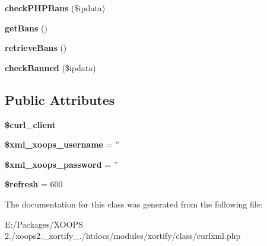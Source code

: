 \begin{DoxyCompactItemize}
\item 
\hypertarget{class_c_u_r_l_x_m_l_xortify_exchange_a1d5d2753c5259c572ea6ded19fced6f5}{{\bfseries check\-P\-H\-P\-Bans} (\$ipdata)}\label{class_c_u_r_l_x_m_l_xortify_exchange_a1d5d2753c5259c572ea6ded19fced6f5}

\item 
\hypertarget{class_c_u_r_l_x_m_l_xortify_exchange_ab4614d34ca9a0546a1885d407137cd22}{{\bfseries get\-Bans} ()}\label{class_c_u_r_l_x_m_l_xortify_exchange_ab4614d34ca9a0546a1885d407137cd22}

\item 
\hypertarget{class_c_u_r_l_x_m_l_xortify_exchange_ac5d062cd907b0b9230a3a7fb7a71cf41}{{\bfseries retrieve\-Bans} ()}\label{class_c_u_r_l_x_m_l_xortify_exchange_ac5d062cd907b0b9230a3a7fb7a71cf41}

\item 
\hypertarget{class_c_u_r_l_x_m_l_xortify_exchange_ae706dddc27baaa3eb21ac2e9417e7760}{{\bfseries check\-Banned} (\$ipdata)}\label{class_c_u_r_l_x_m_l_xortify_exchange_ae706dddc27baaa3eb21ac2e9417e7760}

\end{DoxyCompactItemize}
\subsection*{Public Attributes}
\begin{DoxyCompactItemize}
\item 
\hypertarget{class_c_u_r_l_x_m_l_xortify_exchange_a0f42b7cba3cc6e6acb3da741c2cede43}{{\bfseries \$curl\-\_\-client}}\label{class_c_u_r_l_x_m_l_xortify_exchange_a0f42b7cba3cc6e6acb3da741c2cede43}

\item 
\hypertarget{class_c_u_r_l_x_m_l_xortify_exchange_a53b360bc4ca889c1054eae6564d3b724}{{\bfseries \$xml\-\_\-xoops\-\_\-username} = ''}\label{class_c_u_r_l_x_m_l_xortify_exchange_a53b360bc4ca889c1054eae6564d3b724}

\item 
\hypertarget{class_c_u_r_l_x_m_l_xortify_exchange_a2cd313925dbe3fa47ef66f42a675aded}{{\bfseries \$xml\-\_\-xoops\-\_\-password} = ''}\label{class_c_u_r_l_x_m_l_xortify_exchange_a2cd313925dbe3fa47ef66f42a675aded}

\item 
\hypertarget{class_c_u_r_l_x_m_l_xortify_exchange_af2a143728186f473b2cc63b0dcec59d8}{{\bfseries \$refresh} = 600}\label{class_c_u_r_l_x_m_l_xortify_exchange_af2a143728186f473b2cc63b0dcec59d8}

\end{DoxyCompactItemize}


The documentation for this class was generated from the following file\-:\begin{DoxyCompactItemize}
\item 
E\-:/\-Packages/\-X\-O\-O\-P\-S 2./xoops2.\-\_\-xortify\-\_./htdocs/modules/xortify/class/curlxml.\-php\end{DoxyCompactItemize}
